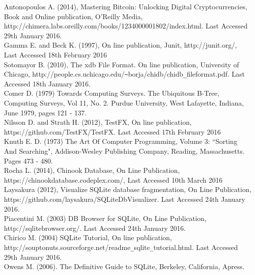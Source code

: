 \begin{thebibliography}{0}

Antonopoulos A. (2014), Mastering Bitcoin: Unlocking Digital Cryptocurrencies, Book and Online publication, O'Reilly Media, http://chimera.labs.oreilly.com/books/1234000001802/index.html. Last Accessed 29th January 2016.
\\
Gamma E. and Beck K. (1997), On line publication, Junit, http://junit.org/, Last Accessed 18th February 2016
\\
Sotomayor B. (2010), The xdb File Format. On line publication, University of Chicago, http://people.cs.uchicago.edu/\verb|~|borja/chidb/chidb\verb|_|fileformat.pdf. Last Accessed 18th January 2016.
\\
Comer D. (1979) Towards Computing Surveys. The Ubiquitous B-Tree, Computing Surveys, Vol 11, No. 2. Purdue University, West Lafayette, Indiana, June 1979, pages 121 - 137.
\\
Nilsson D. and Strath H. (2012), TestFX, On line publication, https://github.com/TestFX/TestFX. Last Accessed 17th February 2016
\\
Knuth E. D. (1973) The Art Of Computer Programming, Volume 3: ``Sorting And Searching", Addison-Wesley Publishing Company, Reading, Massachusetts. Pages 473 - 480.
\\
Rocha L. (2014), Chinook Database, On Line Publication, https://chinookdatabase.codeplex.com/, Last Accessed 10th March 2016
\\
Laysakura (2012), Visualize SQLite database fragmentation, On Line Publication, https://github.com/laysakura/SQLiteDbVisualizer. Last Accessed 24th January 2016.
\\
Piacentini M. (2003) DB Browser for SQLite, On Line Publication, http://sqlitebrowser.org/. Last Accessed 24th January 2016.
\\
Chirico M. (2004) SQLite Tutorial, On line publication, http://souptonuts.sourceforge.net/readme\verb|_|sqlite\verb|_|tutorial.html. Last Accessed 29th January 2016.
\\
Owens M. (2006). The Definitive Guide to SQLite, Berkeley, California, Apress. 

\end{thebibliography}
